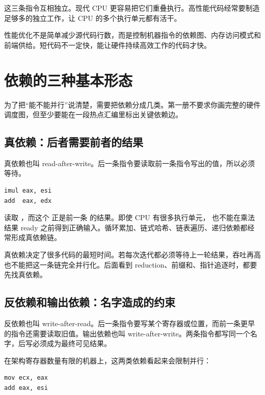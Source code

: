 这三条指令互相独立。现代 CPU 更容易把它们重叠执行。高性能代码经常要制造足够多的独立工作，让 CPU 的多个执行单元都有活干。

\begin{keyidea}
性能优化不是简单减少源代码行数，而是控制机器指令的依赖图、内存访问模式和前端供给。短代码不一定快，能让硬件持续高效工作的代码才快。
\end{keyidea}

\section{依赖的三种基本形态}

为了把“能不能并行”说清楚，需要把依赖分成几类。第一册不要求你画完整的硬件调度图，但至少要能在一段热点汇编里标出关键依赖边。

\subsection{真依赖：后者需要前者的结果}

真依赖也叫 read-after-write。后一条指令要读取前一条指令写出的值，所以必须等待。

\begin{lstlisting}
imul eax, esi
add  eax, edx
\end{lstlisting}

 读取 ，而这个  正是前一条  的结果。即使 CPU 有很多执行单元， 也不能在乘法结果 ready 之前得到正确输入。循环累加、链式哈希、链表遍历、递归依赖都经常形成真依赖链。

真依赖决定了很多代码的最短时间。若每次迭代都必须等待上一轮结果，吞吐再高也不能把这一条链完全并行化。后面看到 reduction、前缀和、指针追逐时，都要先找真依赖。

\subsection{反依赖和输出依赖：名字造成的约束}

反依赖也叫 write-after-read。后一条指令要写某个寄存器或位置，而前一条更早的指令还需要读取旧值。输出依赖也叫 write-after-write。两条指令都写同一个名字，后写必须成为最终可见结果。

在架构寄存器数量有限的机器上，这两类依赖看起来会限制并行：

\begin{lstlisting}
mov ecx, eax
add eax, esi
\end{lstlisting}

